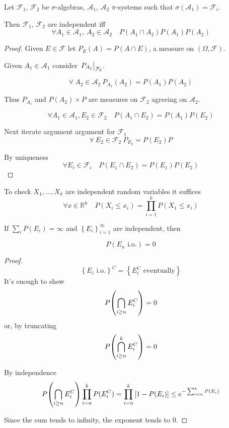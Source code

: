 \begin{lemma}
	Let $\mathcal{F}_1$, $\mathcal{F}_2$ be $\sigma$-algebras, $\mathcal{A}_1$, $\mathcal{A}_2$ $\pi$-systems such that $\sigma(\mathcal{A_1})=\mathcal{F}_i$.
	
	Then $\mathcal{F}_1$, $\mathcal{F}_2$ are independent iff 
	$$\forall A_1\in \mathcal{A}_1, \: A_2\in \mathcal{A}_2 \quad P(A_1\cap A_2) P(A_1)P(A_2)$$ 
	\begin{proof}
		Given $E \in \mathcal{F}$ let $P_E(A) = P(A\cap E)$, a measure on $(\Omega, \mathcal{F})$.
		
		Given $A_1\in \mathcal{A}_1$ consider $\eval{P_{A_1}}_{\mathcal{F}_2}$.
			
		$$\forall \: A_2\in \mathcal{A}_2 \: P_{A_1}(A_2) = P(A_1)P(A_2)$$
		
		Thus $P_{A_1}$ and $P(A_2)\times P$ are measures on $\mathcal{F}_2$ agreeing on $\mathcal{A}_2$.
		
		$$\forall A_1 \in \mathcal{A}_1 , E_2\in \mathcal{F}_2  \quad P(A_1\cap E_2) = P(A_1)P(E_2)$$
		
		Next iterate argument argument for  $\mathcal{F}_1 $
		$$\forall \: E_2\in \mathcal{F}_2 \: P_{E_2}= P(E_2)P$$
		
		By uniqueness 
		$$\forall E_i \in \mathcal{F}_i \quad P(E_1\cap E_2) = P(E_1)P(E_2)$$  
	\end{proof}

\begin{coll}
	To check $X_1,\dots, X_k$ are independent random variables it suffices 
	$$\forall x\in \mathbb{R}^k  \quad P(X_i\leq x_i) = \prod_{i=1}^k P(X_1\leq x_i)$$ 
\end{coll}
\end{lemma}

\begin{lemma}
	 \label{bc2}
	 If $\sum_i P(E_i) =\infty$ and $\left\{ E_i \right\}_{i=1}^\infty $ are independent, then 
	 
	 $$P(E_n \text{ i.o.}) =0$$
	 \begin{proof}
	 	$$\left\{ E_i  \text{ i.o.} \right\}^C =\left\{ E_i^C  \text{ eventually} \right\} $$
	 	It's enough to show
	 	$$P\qty(\bigcap_{i\geq n} E_i^C) = 0 $$
	 	or, by truncating
	 	$$P\qty(\bigcap_{i\geq n}^k E_i^C) = 0 $$
	 	
	 	By independence
	 	$$P\qty(\bigcap_{i\geq n} E_i^C) \prod_{i=n}^k P(E_i^C) = \prod_{i=n}^k \qty[1-P(E_i)] \leq e^{-\sum_{i=n}^k P(E_i)}$$
	 	
	 	Since the sum tends to infinity, the exponent tends to $0$.
	 \end{proof}
\end{lemma}

